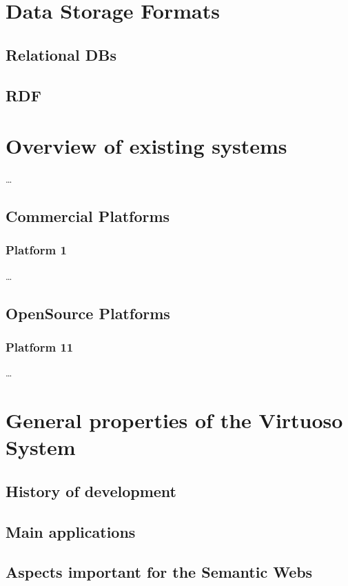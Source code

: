 \section{Data Storage Formats}
\subsection{Relational DBs}
\subsection{RDF}

\section{Overview of existing systems}
\ldots

\subsection{Commercial Platforms}
\label{sec:commercial_platforms}

\subsubsection{Platform 1}
\ldots

\subsection{OpenSource Platforms}
\label{sec:open_source_platforms}

\subsubsection{Platform 11}
\ldots

\section{General properties of the Virtuoso System}
\subsection{History of development}
\subsection{Main applications}
\subsection{Aspects important for the Semantic Webs}

